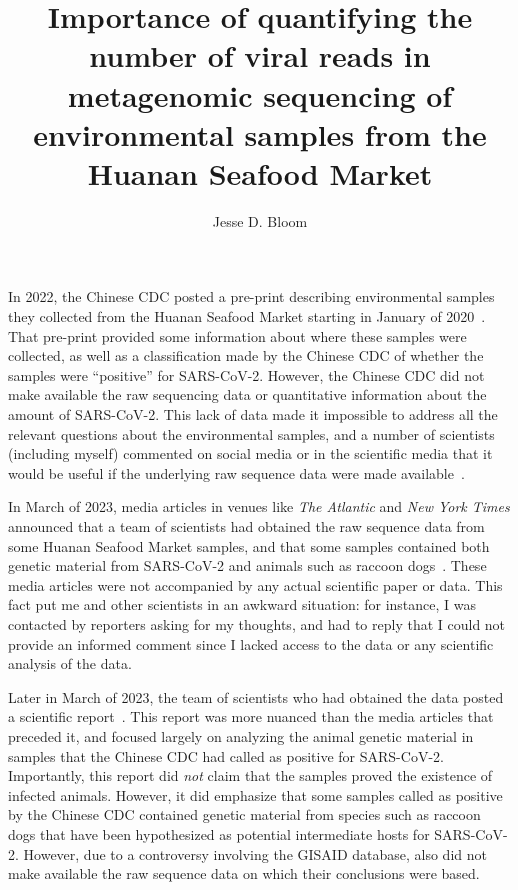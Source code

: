 \documentclass[9pt,twocolumn,twoside]{gsajnl_modified}
\title{Importance of quantifying the number of viral reads in metagenomic sequencing of environmental samples from the Huanan Seafood Market}
\author[]{\Large Jesse D. Bloom}
\affil[]{Fred Hutchinson Cancer Center; Howard Hughes Medical Institute

}
\begin{document}
\maketitle
\thispagestyle{firststyle}
\firstpagefootnote

\vspace{-33pt}%

\lettrine[lines=2]{\color{color2}I}{}n 2022, the Chinese CDC posted a pre-print describing environmental samples they collected from the Huanan Seafood Market starting in January of 2020~\citep{liu2022surveillance}.
That pre-print provided some information about where these samples were collected, as well as a classification made by the Chinese CDC of whether the samples were ``positive'' for SARS-CoV-2.
However, the Chinese CDC did not make available the raw sequencing data or quantitative information about the amount of SARS-CoV-2.
This lack of data made it impossible to address all the relevant questions about the environmental samples, and a number of scientists (including myself) commented on social media or in the scientific media that it would be useful if the underlying raw sequence data were made available~\citep{cohen2022studies, cohen2022anywhere}.

In March of 2023, media articles in venues like \textit{The Atlantic} and \textit{New York Times} announced that a team of scientists had obtained the raw sequence data from some Huanan Seafood Market samples, and that some samples contained both genetic material from SARS-CoV-2 and animals such as raccoon dogs~\citep{wu2023atlantic, mueller2023nytimes}.
These media articles were not accompanied by any actual scientific paper or data.
This fact put me and other scientists in an awkward situation: for instance, I was contacted by reporters asking for my thoughts, and had to reply that I could not provide an informed comment since I lacked access to the data or any scientific analysis of the data.

Later in March of 2023, the team of scientists who had obtained the data posted a scientific report~\citep{crits2023genetic}.
This report was more nuanced than the media articles that preceded it, and focused largely on analyzing the animal genetic material in samples that the Chinese CDC had called as positive for SARS-CoV-2.
Importantly, this report did \emph{not} claim that the samples proved the existence of infected animals.
However, it did emphasize that some samples called as positive by the Chinese CDC contained genetic material from species such as raccoon dogs that have been hypothesized as potential intermediate hosts for SARS-CoV-2.
However, due to a controversy involving the GISAID database, \citet{crits2023genetic} also did not make available the raw sequence data on which their conclusions were based.
\end{document}

